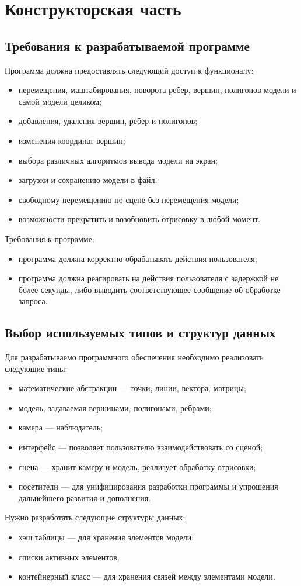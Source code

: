 \chapter{Конструкторская часть}
\section{Требования к разрабатываемой программе}
Программа должна предоставлять следующий доступ к функционалу:
\begin{itemize}
	\item перемещения, маштабирования, поворота ребер, вершин, полигонов модели и самой модели целиком;
	\item добавления, удаления вершин, ребер и полигонов;
	\item изменения координат вершин;
	\item выбора различных алгоритмов вывода модели на экран;
	\item загрузки и сохранению модели в файл;
	\item свободному перемещению по сцене без перемещения модели;
	\item возможности прекратить и возобновить отрисовку в любой момент.
\end{itemize}
Требования к программе:
\begin{itemize}
	\item программа должна корректно обрабатывать действия пользователя;
	\item программа должна реагировать на действия пользователя с задержкой не более секунды, либо выводить соответствующее сообщение об обработке запроса.
\end{itemize}
\section{ Выбор используемых типов и структур данных}
Для разрабатываемо программного обеспечения необходимо реализовать следующие типы:
\begin{itemize}
	\item математические абстракции --- точки, линии, вектора, матрицы;
	\item модель, задаваемая вершинами, полигонами, ребрами;
	\item камера --- наблюдатель;
	\item интерфейс --- позволяет пользователю взаимодействовать со сценой;
	\item сцена --- хранит камеру и модель, реализует обработку отрисовки;
	\item посетители --- для унифицирования разработки программы и упрошения дальнейшего развития и дополнения.
\end{itemize}
Нужно разработать следующие структуры данных: 
\begin{itemize}
	\item хэш таблицы --- для хранения элементов модели;
	\item списки активных элементов;
	\item контейнерный класс --- для хранения связей между элементами модели.
\end{itemize}
